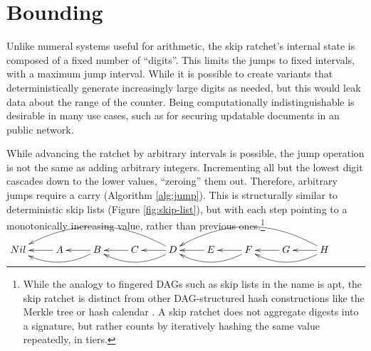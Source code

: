 \documentclass[twocolumn]{article}
\begin{document}
    \section{Bounding}
    
    Unlike numeral systems useful for arithmetic, the skip ratchet's internal state is composed of a fixed number of ``digits''. This limits the jumps to fixed intervals, with a maximum jump interval. While it is possible to create variants that deterministically generate increasingly large digits as needed, but this would leak data about the range of the counter. Being computationally indistinguishable is desirable in many use cases, such as for securing updatable documents in an public network.
    
    While advancing the ratchet by arbitrary intervals is possible, the jump operation is not the same as adding arbitrary integers. Incrementing all but the lowest digit cascades down to the lower values, ``zeroing'' them out. Therefore, arbitrary jumps require a carry (Algorithm \ref{alg:jump}). This is structurally similar to deterministic skip lists \cite{deterministic-skip-lists} (Figure \ref{fig:skip-list}), but with each step pointing to a monotonically increasing value, rather than previous ones.\footnote{While the analogy to fingered DAGs such as skip lists in the name is apt, the skip ratchet is distinct from other DAG-structured hash constructions like the Merkle tree \cite{merkle-tree} or hash calendar \cite{distributed-hash-calendar}. A skip ratchet does not aggregate digests into a signature, but rather counts by iteratively hashing the same value repeatedly, in tiers.} \\
 
	\begin{figure*}[h]
		\centering
		
		$\xymatrix{
			  Nil
			& A \ar[l]
			& B \ar[l] , \ar@/^1pc/[ll]
			& C \ar[l]
			& D \ar[l] , \ar@/^1pc/[ll] , \ar@/_2pc/[llll]
			& E \ar[l]
			& F \ar[l] , \ar@/^1pc/[ll]
			& G \ar[l]
			& H \ar[l] , \ar@/^1pc/[ll] , \ar@/_2pc/[llll]
		}$
	
		\caption{Deterministic Skip List}
		\label{fig:skip-list}
	\end{figure*}
\end{document}
